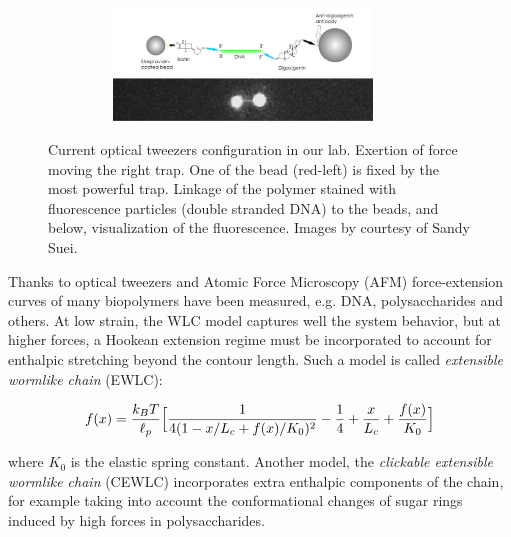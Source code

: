 \begin{figure}[ht]
\begin{minipage}{0.35\textwidth}
  \begin{subfigure}{0.99\textwidth}
    \includegraphics[width=0.9\textwidth,height=3cm]{Figures/chapter-intro/tweezers_linkage.png}%
    \caption{\label{tweezers-linkage}}
  \end{subfigure}
\end{minipage}

\caption[Optical Tweezers]{\protect{} Current
optical tweezers configuration in our lab. \protect{}
Exertion of force moving the right trap. One of the bead (red-left) is fixed by
the most powerful trap. \protect{} Linkage of the
 polymer stained with fluorescence particles (double stranded DNA) to the beads,
 and below, visualization of the fluorescence. Images by courtesy of Sandy Suei. }
\label{fig:optical_tweezers}
\end{figure}


Thanks to optical tweezers and Atomic Force Microscopy
(AFM)\citep{janshoff_force_2000} force-extension curves of many
biopolymers have been measured, e.g. DNA\citep{marko_stretching_1995},
polysaccharides\citep{marszalek_atomic_1999} and others. At low strain, the WLC
model captures well the system behavior, but at higher forces, a Hookean
extension regime must be incorporated to account for enthalpic stretching
beyond the contour length.
Such a model is called \emph{extensible wormlike chain}
(EWLC)\citep{wang_stretching_1997}:

\begin{equation}\label{EWLC}
f(x)=\frac{k_B{}T}{\ell_p} \Big[ \frac{1}{4(1 - x/L_c + f(x)/K_0)^2}
-\frac{1}{4}+\frac{x}{L_c} + \frac{f(x)}{K_0}\Big]
\end{equation}


where $K_0$ is the elastic spring constant. Another model, the
\emph{clickable extensible wormlike chain} (CEWLC) incorporates extra
enthalpic components of the chain, for example taking into
account the conformational changes of sugar rings induced by high forces in polysaccharides\citep{haverkamp_model_2007}.


